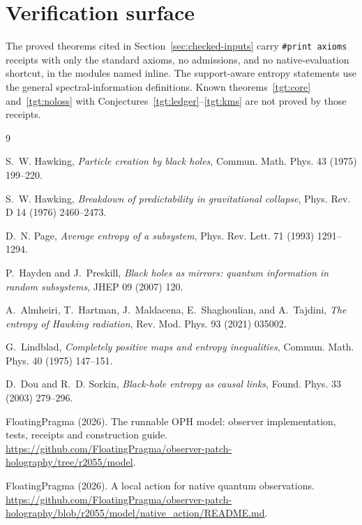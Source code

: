 \documentclass[11pt]{article}
\theoremstyle{remark}
\begin{document}
\section{Verification surface}

The proved theorems cited in Section~\ref{sec:checked-inputs} carry \texttt{\#print axioms}
receipts with only the standard axioms, no admissions, and no
native-evaluation shortcut, in the modules named inline. The support-aware
entropy statements use the general spectral-information definitions.
Known theorems~\ref{tgt:core} and~\ref{tgt:noloss} with Conjectures~\ref{tgt:ledger}--\ref{tgt:kms} are not proved by those receipts.

\begin{thebibliography}{9}

 S.~W. Hawking,
\emph{Particle creation by black holes},
Commun. Math. Phys. 43 (1975) 199--220.

 S.~W. Hawking,
\emph{Breakdown of predictability in gravitational collapse},
Phys. Rev. D 14 (1976) 2460--2473.

 D.~N. Page,
\emph{Average entropy of a subsystem},
Phys. Rev. Lett. 71 (1993) 1291--1294.

 P.~Hayden and J.~Preskill,
\emph{Black holes as mirrors: quantum information in random subsystems},
JHEP 09 (2007) 120.

 A.~Almheiri, T.~Hartman, J.~Maldacena, E.~Shaghoulian,
and A.~Tajdini,
\emph{The entropy of Hawking radiation},
Rev. Mod. Phys. 93 (2021) 035002.

 G.~Lindblad,
\emph{Completely positive maps and entropy inequalities},
Commun. Math. Phys. 40 (1975) 147--151.

 D.~Dou and R.~D. Sorkin,
\emph{Black-hole entropy as causal links},
Found. Phys. 33 (2003) 279--296.

FloatingPragma (2026). The runnable OPH model: observer implementation,
tests, receipts and construction guide.
\url{https://github.com/FloatingPragma/observer-patch-holography/tree/r2055/model}.

FloatingPragma (2026). A local action for native quantum observations.
\url{https://github.com/FloatingPragma/observer-patch-holography/blob/r2055/model/native_action/README.md}.


\end{thebibliography}
\end{document}
